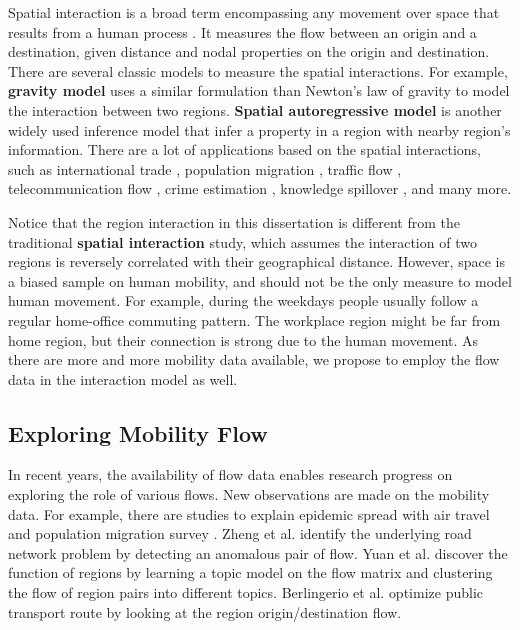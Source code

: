 Spatial interaction is a broad term encompassing any movement over space that results from a human process \cite{haynes1984gravity,rodrigue2013geography}. It measures the flow between an origin and a destination, given distance and nodal properties on the origin and destination.  There are several classic models to measure the spatial interactions. For example, \textbf{gravity model} \cite{matyas1997proper} uses a similar formulation than Newton's law of gravity to model the interaction between two regions.
\textbf{Spatial autoregressive model} \cite{anselin1980estimation} is another widely used inference model that infer a property in a region with nearby region's information. There are a lot of  applications  based on the spatial interactions, such as international trade \cite{carrere2006revisiting, egger2003proper, martinez2003augmented}, population migration \cite{hanski1994metapopulation, karemera2000gravity, lewer2008gravity}, traffic flow \cite{jung2008gravity, roughan2002experience, khadaroo2008role}, telecommunication flow \cite{krings2009urban, fischer1994artificial, black1995spatial}, crime estimation \cite{anselin2000spatial, kakamu2008spatial, browning2004paradox}, knowledge spillover \cite{lesage2007knowledge, fischer2006geography}, and many more.



Notice that the region interaction in this dissertation is different from the traditional \textbf{spatial interaction} study, which assumes the interaction of two regions is reversely correlated with their geographical distance. However, space is a biased sample on human mobility, and should not be the only measure to model human movement. For example, during the weekdays people usually follow a regular home-office commuting pattern. The workplace region might be far from home region, but their connection is strong due to the human movement. As there are more and more mobility data available, we propose to employ the flow data in the interaction model as well.







\subsection{Exploring Mobility Flow}

In recent years, the availability of flow data enables research progress on exploring the role of various flows. New observations are made on the mobility data. For example, there are studies to explain epidemic spread with air travel \cite{huang2013global, tatem2014mapping} and population migration survey \cite{pindolia2013demographics}. Zheng et al. \cite{zheng2011urban} identify the underlying road network problem by detecting an anomalous pair of flow. Yuan et al. \cite{yuan2012discovering} discover the function of regions by learning a topic model on the flow matrix and clustering the flow of region pairs into different topics.  Berlingerio et al. \cite{berlingerio2013allaboard} optimize public transport route by looking at the region origin/destination flow. 



